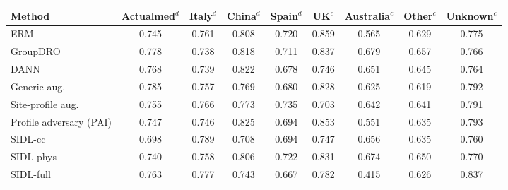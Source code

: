 \begin{tabular}{lcccccccc}
\toprule
Method & Actualmed$^{d}$ & Italy$^{d}$ & China$^{d}$ & Spain$^{d}$ & UK$^{c}$ & Australia$^{c}$ & Other$^{c}$ & Unknown$^{c}$ \\
\midrule
ERM & 0.745 & 0.761 & 0.808 & 0.720 & 0.859 & 0.565 & 0.629 & 0.775 \\
GroupDRO & 0.778 & 0.738 & 0.818 & 0.711 & 0.837 & 0.679 & 0.657 & 0.766 \\
DANN & 0.768 & 0.739 & 0.822 & 0.678 & 0.746 & 0.651 & 0.645 & 0.764 \\
Generic aug. & 0.785 & 0.757 & 0.769 & 0.680 & 0.828 & 0.625 & 0.619 & 0.792 \\
Site-profile aug. & 0.755 & 0.766 & 0.773 & 0.735 & 0.703 & 0.642 & 0.641 & 0.791 \\
Profile adversary (PAI) & 0.747 & 0.746 & 0.825 & 0.694 & 0.853 & 0.551 & 0.635 & 0.793 \\
SIDL-cc & 0.698 & 0.789 & 0.708 & 0.694 & 0.747 & 0.656 & 0.635 & 0.760 \\
SIDL-phys & 0.740 & 0.758 & 0.806 & 0.722 & 0.831 & 0.674 & 0.650 & 0.770 \\
SIDL-full & 0.763 & 0.777 & 0.743 & 0.667 & 0.782 & 0.415 & 0.626 & 0.837 \\
\bottomrule
\end{tabular}